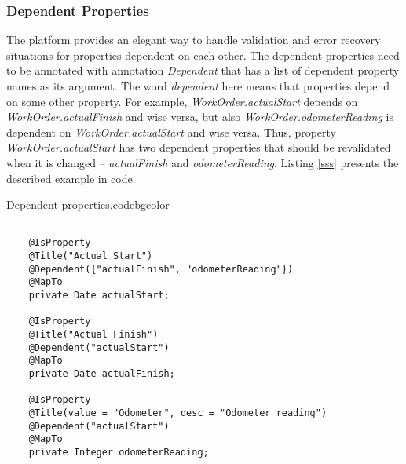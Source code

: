 \subsubsection{Dependent Properties}

  The platform provides an elegant way to handle validation and error recovery situations for properties dependent on each other. 
  The dependent properties need to be annotated with annotation \emph{Dependent} that has a list of dependent property names as its argument. 
  The word \emph{dependent} here means that properties depend on some other property. 
  For example, \emph{WorkOrder.actualStart} depends on \emph{WorkOrder.actualFinish} and wise versa, but also \emph{WorkOrder.odometerReading} is dependent on \emph{WorkOrder.actualStart} and wise versa. 
  Thus, property \emph{WorkOrder.actualStart} has two dependent properties that should be revalidated when it is changed -- \emph{actualFinish} and \emph{odometerReading}.
  Listing \ref{sss} presents the described example in code.

  \begin{code}{Dependent properties.}{\label{lst:DependentProperties}}{codebgcolor}
    \begin{lstlisting}

    @IsProperty
    @Title("Actual Start")
    @Dependent({"actualFinish", "odometerReading"})
    @MapTo
    private Date actualStart;

    @IsProperty
    @Title("Actual Finish")
    @Dependent("actualStart")
    @MapTo
    private Date actualFinish;

    @IsProperty
    @Title(value = "Odometer", desc = "Odometer reading")
    @Dependent("actualStart")
    @MapTo
    private Integer odometerReading;
    \end{lstlisting}
  \end{code}


% 
% 
% 
% 
